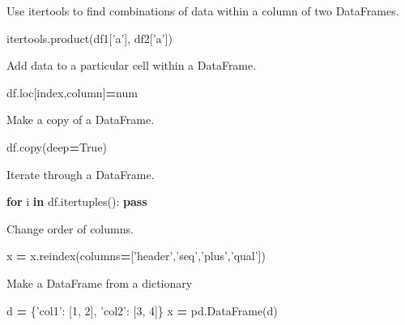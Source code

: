 \documentclass[]{book}
\newenvironment{Shaded}{\begin{snugshade}}{\end{snugshade}}
\newcommand{\ControlFlowTok}[1]{\textcolor[rgb]{0.13,0.29,0.53}{\textbf{#1}}}
\newcommand{\DecValTok}[1]{\textcolor[rgb]{0.00,0.00,0.81}{#1}}
\newcommand{\KeywordTok}[1]{\textcolor[rgb]{0.13,0.29,0.53}{\textbf{#1}}}
\newcommand{\NormalTok}[1]{#1}
\newcommand{\OperatorTok}[1]{\textcolor[rgb]{0.81,0.36,0.00}{\textbf{#1}}}
\newcommand{\StringTok}[1]{\textcolor[rgb]{0.31,0.60,0.02}{#1}}
\newcommand{\VariableTok}[1]{\textcolor[rgb]{0.00,0.00,0.00}{#1}}
\begin{document}
Use itertools to find combinations of data within a column of two DataFrames.

\begin{Shaded}
\begin{Highlighting}[]
\NormalTok{itertools.product(df1[}\StringTok{'a'}\NormalTok{], df2[}\StringTok{'a'}\NormalTok{])}
\end{Highlighting}
\end{Shaded}

Add data to a particular cell within a DataFrame.

\begin{Shaded}
\begin{Highlighting}[]
\NormalTok{df.loc[index,column]}\OperatorTok{=}\NormalTok{num}
\end{Highlighting}
\end{Shaded}

Make a copy of a DataFrame.

\begin{Shaded}
\begin{Highlighting}[]
\NormalTok{df.copy(deep}\OperatorTok{=}\VariableTok{True}\NormalTok{)}
\end{Highlighting}
\end{Shaded}

Iterate through a DataFrame.

\begin{Shaded}
\begin{Highlighting}[]
\ControlFlowTok{for}\NormalTok{ i }\KeywordTok{in}\NormalTok{ df.itertuples():}
    \ControlFlowTok{pass}
\end{Highlighting}
\end{Shaded}

Change order of columns.

\begin{Shaded}
\begin{Highlighting}[]
\NormalTok{x }\OperatorTok{=}\NormalTok{ x.reindex(columns}\OperatorTok{=}\NormalTok{[}\StringTok{'header'}\NormalTok{,}\StringTok{'seq'}\NormalTok{,}\StringTok{'plus'}\NormalTok{,}\StringTok{'qual'}\NormalTok{])}
\end{Highlighting}
\end{Shaded}

Make a DataFrame from a dictionary

\begin{Shaded}
\begin{Highlighting}[]
\NormalTok{d }\OperatorTok{=}\NormalTok{ \{}\StringTok{'col1'}\NormalTok{: [}\DecValTok{1}\NormalTok{, }\DecValTok{2}\NormalTok{], }\StringTok{'col2'}\NormalTok{: [}\DecValTok{3}\NormalTok{, }\DecValTok{4}\NormalTok{]\}}
\NormalTok{x }\OperatorTok{=}\NormalTok{ pd.DataFrame(d)}
\end{Highlighting}
\end{Shaded}
\end{document}
